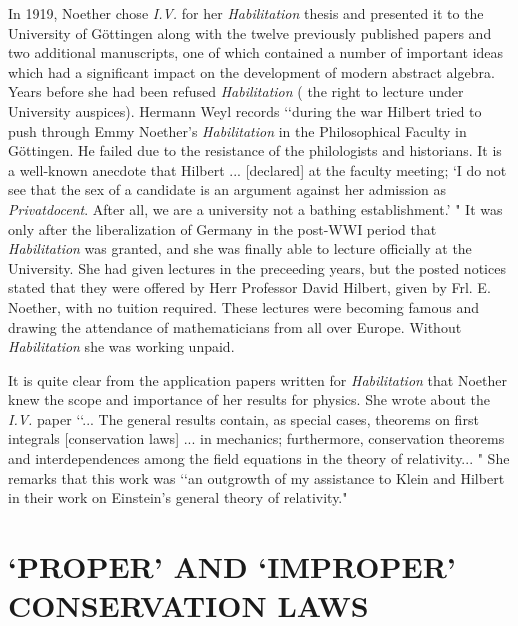 \documentclass[12pt]{article}
\begin{document}
In 1919, Noether chose {\it{I.V.}} for her {\it{Habilitation}} thesis and presented it
to the University of G\"{o}ttingen along with the twelve previously published
papers and two additional  manuscripts, one of which \cite{schm} contained a
number of important ideas which had a significant impact on the development of
modern abstract algebra. Years before she had been refused {\it{Habilitation}} 
( the right to lecture under University auspices).  Hermann Weyl records
\cite{weyl} \lq\lq during the war Hilbert tried to push through Emmy Noether's
{\it{Habilitation}} in the Philosophical Faculty in G\"{o}ttingen. He failed
due to the resistance of the philologists and historians.  It is a well-known
anecdote that Hilbert ... [declared] at the faculty meeting; \lq I do not see
that the sex of a candidate is an argument against her admission as
{\it{Privatdocent}}. After all, we are a university not a bathing
establishment.' " It was only after the liberalization of Germany in the
post-WWI period that   {\it{ Habilitation}} was granted, and she was finally
able to lecture officially at the University. She had given lectures in the
preceeding years, but the posted notices  stated that they were offered by Herr
Professor David Hilbert,  given by Frl. E. Noether,  with no tuition required.
These  lectures were becoming famous and drawing the attendance of
mathematicians from all over Europe.  Without {\it{Habilitation}} she was
working unpaid.

It is quite clear from                     the application papers written for
{\it{Habilitation}} that Noether knew the scope and importance of her results
for physics. She wrote about the {\it{I.V.}} paper \cite{Dick} \lq\lq ...  The general
results  contain, as special cases, theorems on first integrals [conservation
laws] ... in mechanics; furthermore, conservation theorems and interdependences
among the field equations in the theory of relativity... " She remarks 
that this work was \lq\lq an outgrowth of my assistance to Klein and Hilbert in
their work on Einstein's  general theory of relativity."
\section{`PROPER' AND  `IMPROPER' CONSERVATION LAWS}
\end{document}
